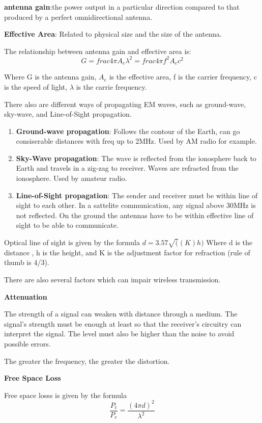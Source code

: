 \documentclass{article}
\begin{document}
\textbf{antenna gain}:the power output in a particular direction compared to that produced by a perfect omnidirectional antenna.

\textbf{Effective Area}: Related to physical size and the size of the antenna.

The relationship between antenna gain and effective area is:
$$G=frac{4\pi A_e}{\lambda ^2} = frac{4\pi f^2 A_e}{c^2}$$

Where G is the antenna gain, $A_e$ is the effective area, f is the carrier frequency, c is the speed of light, $\lambda$ is the carrie 
frequency.

There also are different ways of propagating EM waves, such as ground-wave, sky-wave, and Line-of-Sight propagation.
\begin{enumerate}
		\item{\textbf{Ground-wave propagation}}: Follows the contour of the Earth, can go consiserable distances with freq up to 
				2MHz. Used by AM radio for example.
		\item{\textbf{Sky-Wave propagation}}: The wave is reflected from the ionosphere back to Earth and travels in a zig-zag to
				receiver. Waves are refracted from the ionosphere. Used by amateur radio.
		\item{\textbf{Line-of-Sight propagation}}: The sender and receiver must be within line of sight to each other. In
				a sattelite communication, any signal above 30MHz is not reflected. On the ground the antennas have to be
				within effective line of sight to be able to communicate.
\end{enumerate}
				Optical line of sight is given by the formula $d = 3.57\sqrt((K)h)$
Where d is the distance , h is the height, and K is the adjustment factor for refraction (rule of thumb is 4/3).

There are also several factors which can impair wireless transmission.

\hspace{10mm}\textbf{Attenuation}

The strength of a signal can weaken with distance through a medium. The signal's strength must be enough at least so 
that the receiver's circuitry can interpret the signal. The level must also be higher than the noise to avoid possible
errors. 

The greater the frequency, the greater the distortion.

\hspace{10mm}\textbf{Free Space Loss}

Free space losss is given by the formula $$\frac{P_t}{P_r} = \frac{(4\pi d)^2}{\lambda ^2}$$
\end{document}
